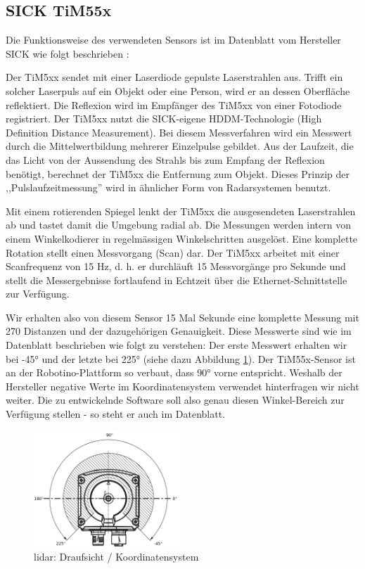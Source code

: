 \subsection{SICK TiM55x}
\label{chap:tim55x}
Die Funktionsweise des verwendeten Sensors ist im Datenblatt vom Hersteller SICK wie folgt beschrieben \cite{tim55x-techinfo}:
\begin{formal}
Der TiM5xx sendet mit einer Laserdiode gepulste Laserstrahlen aus. Trifft ein solcher Laserpuls auf ein Objekt oder eine Person, wird er an dessen Oberfläche reflektiert. Die Reflexion wird im Empfänger des TiM5xx von einer Fotodiode registriert. Der TiM5xx nutzt die SICK-eigene HDDM-Technologie (High Definition Distance Measurement). Bei diesem Messverfahren wird ein Messwert durch die Mittelwertbildung mehrerer Einzelpulse gebildet. Aus der Laufzeit, die das Licht von der Aussendung des Strahls bis zum Empfang der Reflexion benötigt, berechnet der TiM5xx die Entfernung zum Objekt. Dieses Prinzip der ,,Pulslaufzeitmessung'' wird in ähnlicher Form von Radarsystemen benutzt.

Mit einem rotierenden Spiegel lenkt der TiM5xx die ausgesendeten Laserstrahlen ab und tastet damit die Umgebung radial ab. Die Messungen werden intern von einem Winkelkodierer in regelmässigen Winkelschritten ausgelöst. Eine komplette Rotation stellt einen Messvorgang (Scan) dar. Der TiM5xx arbeitet mit einer Scanfrequenz von 15 Hz, d. h. er durchläuft 15 Messvorgänge pro Sekunde und stellt die Messergebnisse fortlaufend in Echtzeit über die Ethernet-Schnittstelle zur Verfügung.
\end{formal}

Wir erhalten also von diesem Sensor 15 Mal Sekunde eine komplette Messung mit 270 Distanzen und der dazugehörigen Genauigkeit. Diese Messwerte sind wie im Datenblatt beschrieben wie folgt zu verstehen: Der erste Messwert erhalten wir bei -45° und der letzte bei 225° (siehe dazu Abbildung \ref{fig:lidar}). Der TiM55x-Sensor ist an der Robotino-Plattform so verbaut, dass 90° vorne entspricht. Weshalb der Hersteller negative Werte im Koordinatensystem verwendet hinterfragen wir nicht weiter. Die zu entwickelnde Software soll also genau diesen Winkel-Bereich zur Verfügung stellen - so steht er auch im Datenblatt.
\begin{figure}[H]
	\centering
	\includegraphics[width=0.5\textwidth]{img/lidar-coordinate.png}
	\caption{\acrshort{lidar}: Draufsicht / Koordinatensystem}
	\label{fig:lidar}
\end{figure}

